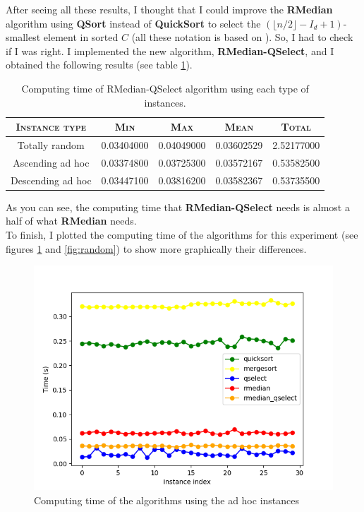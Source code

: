 \documentclass[letterpaper,12pt]{article}
\begin{document}
After seeing all these results, I thought that I could improve the \textbf{RMedian} algorithm using \textbf{QSort} instead of \textbf{QuickSort} to select the $(\lfloor n/2 \rfloor - I_d + 1)$-smallest element in sorted $C$ (all these notation is based on \cite{slides}). So, I had to check if I was right. I implemented the new algorithm, \textbf{RMedian-QSelect}, and I obtained the following results (see table \ref{tab:rmqs}).

\begin{table}[htbp]
    \centering
    \begin{tabular}{c c c c c}
        \textsc{Instance type} & \textsc{Min} & \textsc{Max} & \textsc{Mean} & \textsc{Total} \\ \hline
        Totally random & 0.03404000 & 0.04049000 & 0.03602529 & 2.52177000 \\
        Ascending ad hoc & 0.03374800 & 0.03725300 & 0.03572167 & 0.53582500 \\
        Descending ad hoc & 0.03447100 & 0.03816200 & 0.03582367 & 0.53735500 \\
    \end{tabular}
    \caption{Computing time of RMedian-QSelect algorithm using each type of instances.}
    \label{tab:rmqs}
\end{table}

As you can see, the computing time that \textbf{RMedian-QSelect} needs is almost a half of what \textbf{RMedian} needs.\\

To finish, I plotted the computing time of the algorithms for this experiment (see figures \ref{fig:adhoc} and \ref{fig:random}) to show more graphically their differences.

\begin{figure}[htbp]
    \includegraphics[scale=0.6]{../img/experiment_adhoc.png}
    \centering
    \caption{Computing time of the algorithms using the ad hoc instances}
    \label{fig:adhoc}
\end{figure}
\end{document}
